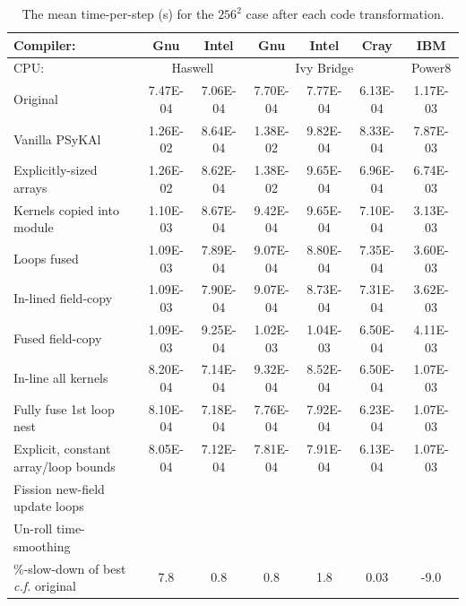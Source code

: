 \documentclass[journal]{IEEEtran}
\newcommand{\psykal}{{PS}y{KA}l\ }
\begin{document}
\begin{table}[!t]
\renewcommand{\arraystretch}{1.3}
\caption{The mean time-per-step (s) for the $256^2$ case after each 
code transformation.}
\label{TABLE_opt_breakdown}
\centering
\begin{tabular}{l|c|c|c|c|c|c}
\hline
Compiler:          &  Gnu  & Intel   & Gnu & Intel & Cray & IBM \\
\hline
CPU:               & \multicolumn{2}{c|}{Haswell} & \multicolumn{3}{c|}{Ivy Bridge} & Power8 \\
\hline
Original                               &  7.47E-04 & 7.06E-04 &	7.70E-04 & 7.77E-04 & 6.13E-04 &  1.17E-03  \\
Vanilla \psykal                        &  1.26E-02 & 8.64E-04 &	1.38E-02 & 9.82E-04 & 8.33E-04 &  7.87E-03  \\
Explicitly-sized arrays                &  1.26E-02 & 8.62E-04 &	1.38E-02 & 9.65E-04 & 6.96E-04 &  6.74E-03  \\
Kernels copied into module             &  1.10E-03 & 8.67E-04 &	9.42E-04 & 9.65E-04 & 7.10E-04 &  3.13E-03  \\
Loops fused                            &  1.09E-03 & 7.89E-04 &	9.07E-04 & 8.80E-04 & 7.35E-04 &  3.60E-03  \\
In-lined field-copy                    &  1.09E-03 & 7.90E-04 &	9.07E-04 & 8.73E-04 & 7.31E-04 &  3.62E-03  \\
Fused field-copy                       &  1.09E-03 & 9.25E-04 &	1.02E-03 & 1.04E-03 & 6.50E-04 &  4.11E-03  \\
In-line all kernels                    &  8.20E-04 & 7.14E-04 &	9.32E-04 & 8.52E-04 & 6.50E-04 &  1.07E-03  \\
Fully fuse 1st loop nest               &  8.10E-04 & 7.18E-04 &	7.76E-04 & 7.92E-04 & 6.23E-04 &  1.07E-03  \\
Explicit, constant array/loop bounds   &  8.05E-04 & 7.12E-04 &	7.81E-04 & 7.91E-04 & 6.13E-04 &  1.07E-03  \\
Fission new-field update loops         &           &          &          &          &          &            \\
Un-roll time-smoothing                 &           &          &          &          &          &            \\
\hline
\parbox{2.5cm}{\%-slow-down of best {\it c.f.} original} & 7.8 & 0.8 & 0.8 & 1.8 & 0.03 & -9.0    \\
\hline
\end{tabular}
\end{table}
\end{document}

